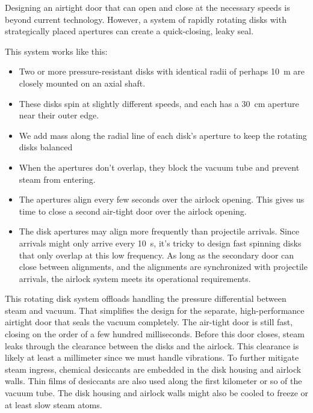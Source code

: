 \documentclass{article}
\begin{document}
Designing an airtight door that can open and close at the necessary speeds is beyond current technology. However, a system of rapidly rotating disks with strategically placed apertures can create a quick-closing, leaky seal.

This system works like this:

\begin{itemize}
\item Two or more pressure-resistant disks with identical radii of perhaps \SI{10}{\meter} are closely mounted on an axial shaft.

\item These disks spin at slightly different speeds, and each has a \SI{30}{\centi\meter} aperture near their outer edge.

\item We add mass along the radial line of each disk's aperture to keep the rotating disks balanced

\item When the apertures don't overlap, they block the vacuum tube and prevent steam from entering.

\item The apertures align every few seconds over the airlock opening.   This gives us time to close a second air-tight door over the airlock opening. 

\item The disk apertures may align more frequently than projectile arrivals.  Since arrivals might only arrive every \SI{10}{\second}, it's tricky to design fast spinning disks that only overlap at this low frequency.  As long as the secondary door can close between alignments, and the alignments are synchronized with projectile arrivals, the airlock system meets its operational requirements.
\end{itemize}

This rotating disk system offloads handling the pressure differential between steam and vacuum.  That simplifies the design for the separate, high-performance airtight door that seals the vacuum completely. The air-tight door is still fast, closing on the order of a few hundred milliseconds.  Before this door closes, steam leaks through the clearance between the disks and the airlock.  This clearance is likely at least a millimeter since we must handle vibrations.  To further mitigate steam ingress, chemical desiccants are embedded in the disk housing and airlock walls. Thin films of desiccants are also used along the first kilometer or so of the vacuum tube.  The disk housing and airlock walls might also be cooled to freeze or at least slow steam atoms.
\end{document}
